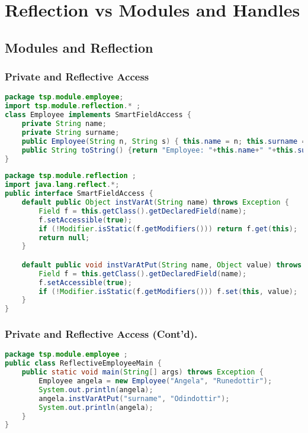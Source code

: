 \section{Reflection vs Modules and Handles}

\subsection{Modules and Reflection}

\subsubsection{Private and Reflective Access}

\begin{lstlisting}[language=Java]
package tsp.module.employee;
import tsp.module.reflection.* ;
class Employee implements SmartFieldAccess {
	private String name;
	private String surname;
	public Employee(String n, String s) { this.name = n; this.surname = s; }
	public String toString() {return "Employee: "+this.name+" "+this.surname;}
}
\end{lstlisting}

\begin{lstlisting}[language=Java]
package tsp.module.reflection ;
import java.lang.reflect.*;
public interface SmartFieldAccess {
	default public Object instVarAt(String name) throws Exception {
		Field f = this.getClass().getDeclaredField(name);
		f.setAccessible(true);
		if (!Modifier.isStatic(f.getModifiers())) return f.get(this);
		return null;
	}

	default public void instVarAtPut(String name, Object value) throws Exception {
		Field f = this.getClass().getDeclaredField(name);
		f.setAccessible(true);
		if (!Modifier.isStatic(f.getModifiers())) f.set(this, value);
	}
}
\end{lstlisting}

\subsubsection{Private and Reflective Access (Cont'd).}

\begin{lstlisting}[language=Java]
package tsp.module.employee ;
public class ReflectiveEmployeeMain {
	public static void main(String[] args) throws Exception {
		Employee angela = new Employee("Angela", "Runedottir");
		System.out.println(angela);
		angela.instVarAtPut("surname", "Odindottir");
		System.out.println(angela);
	}
}
\end{lstlisting}

